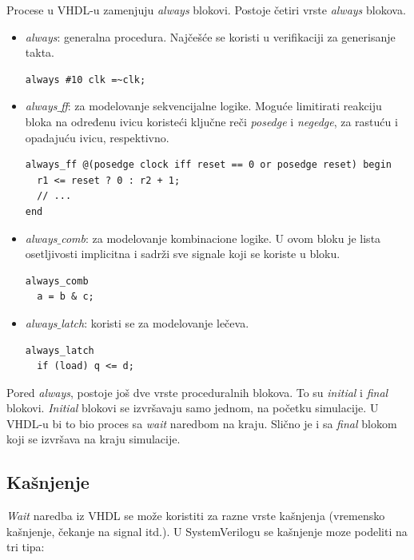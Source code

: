 Procese u VHDL-u zamenjuju \emph{always} blokovi.
Postoje četiri vrste \emph{always} blokova.
\begin{itemize}
\item \emph{always}: generalna procedura. Najčešće se koristi u verifikaciji za
  generisanje takta.
  \begin{lstlisting}
always #10 clk =~clk;
\end{lstlisting}
\item \emph{always\(\_\)ff}: za modelovanje sekvencijalne logike. Moguće
  limitirati reakciju bloka na određenu ivicu koristeći ključne reči
  \emph{posedge} i \emph{negedge}, za rastuću i opadajuću ivicu, respektivno.
  \begin{lstlisting}
always_ff @(posedge clock iff reset == 0 or posedge reset) begin
  r1 <= reset ? 0 : r2 + 1;
  // ...
end
\end{lstlisting}
\item \emph{always\(\_\)comb}: za modelovanje kombinacione logike. U ovom bloku
  je lista osetljivosti implicitna i sadrži sve signale koji se koriste u bloku.
  \begin{lstlisting}
always_comb
  a = b & c;
\end{lstlisting}
\item \emph{always\(\_\)latch}: koristi se za modelovanje lečeva.
  \begin{lstlisting}
always_latch
  if (load) q <= d;
\end{lstlisting}
\end{itemize}

Pored \emph{always}, postoje još dve vrste proceduralnih blokova.
To su \emph{initial} i \emph{final} blokovi.
\emph{Initial} blokovi se izvršavaju samo jednom, na početku simulacije.
U VHDL-u bi to bio proces sa \emph{wait} naredbom na kraju.
Slično je i sa \emph{final} blokom koji se izvršava na kraju simulacije.


\subsection{Kašnjenje}

\emph{Wait} naredba iz VHDL se može koristiti za razne vrste kašnjenja
(vremensko kašnjenje, čekanje na signal itd.).
U SystemVerilogu se kašnjenje moze podeliti na tri tipa:

